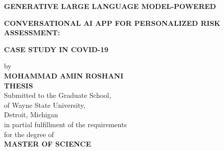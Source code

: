 \centerline{\bf GENERATIVE LARGE LANGUAGE MODEL-POWERED}
\vspace{-0.4cm}
\centerline{\bf CONVERSATIONAL AI APP FOR PERSONALIZED RISK ASSESSMENT:}
\vspace{-0.4cm}
\centerline{\bf CASE STUDY IN COVID-19}

\vskip-0.4cm
\thispagestyle{empty}

\begin{center}
    \vspace{-0.4cm}
    by \\
    {\bf MOHAMMAD AMIN ROSHANI}\\ %
    {\bf THESIS}\\  %
    Submitted to the Graduate School,\\
    of Wayne State University,\\
    Detroit, Michigan\\
    in partial fulfillment of the requirements\\
    for the degree of\\
    {\bf MASTER OF SCIENCE} 
\end{center}

